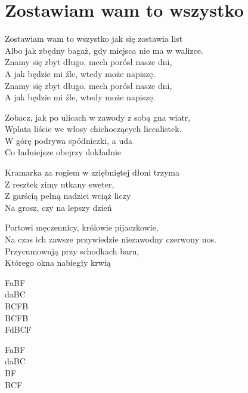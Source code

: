 \section{Zostawiam wam to wszystko}
\begin{text}
Zostawiam wam to wszystko jak się zostawia list\\
Albo jak zbędny bagaż, gdy miejsca nie ma w walizce.\\
Znamy się zbyt długo, mech porósł nasze dni,\\
A jak będzie mi źle, wtedy może napiszę.\\
Znamy się zbyt długo, mech porósł nasze dni,\\
A jak będzie mi źle, wtedy może napiszę.

Zobacz, jak po ulicach w zawody z sobą gna wiatr,\\
Wplata liście we włosy chichoczących licealistek.\\
W górę podrywa spódniczki, a uda\\
Co ładniejsze obejrzy dokładnie

Kramarka za rogiem w zziębniętej dłoni trzyma\\
Z resztek zimy utkany sweter,\\
Z garścią pełną nadziei wciąż liczy\\
Na grosz, czy na lepszy dzień

Portowi męczennicy, królowie pijaczkowie,\\
Na czas ich zawsze przywiedzie niezawodny czerwony nos.\\
Przycumowują przy schodkach baru,\\
Którego okna nabiegły krwią
\end{text}
\begin{chord}
    FaBF\\
    daBC\\
    BCFB\\
    BCFB\\
    FdBCF

    FaBF\\
    daBC\\
    BF\\
    BCF
\end{chord}